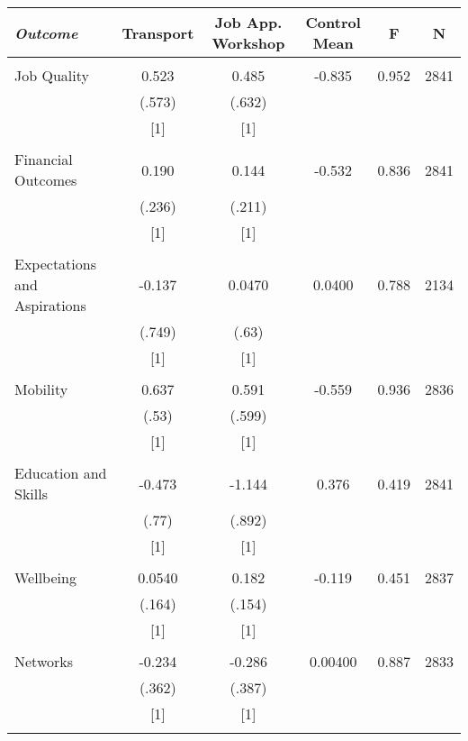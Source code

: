 \begin{tabular}{lccccc} \hline
\multicolumn{1}{l}{\emph{Outcome}} & \multicolumn{1}{c}{Transport} &\multicolumn{1}{c}{Job App. Workshop} & \multicolumn{1}{c}{Control Mean} & \multicolumn{1}{c}{F} & \multicolumn{1}{c}{N} \\ \hline \\
Job Quality & 0.523 & 0.485 & -0.835 & 0.952 & 2841 \\
& (.573) & (.632) &  &  &  \\
& [1] & [1] &  &  &  \\
&  &  &  &  &  \\
Financial Outcomes & 0.190 & 0.144 & -0.532 & 0.836 & 2841 \\
& (.236) & (.211) &  &  &  \\
& [1] & [1] &  &  &  \\
&  &  &  &  &  \\
Expectations and Aspirations & -0.137 & 0.0470 & 0.0400 & 0.788 & 2134 \\
& (.749) & (.63) &  &  &  \\
& [1] & [1] &  &  &  \\
&  &  &  &  &  \\
Mobility & 0.637 & 0.591 & -0.559 & 0.936 & 2836 \\
& (.53) & (.599) &  &  &  \\
& [1] & [1] &  &  &  \\
&  &  &  &  &  \\
Education and Skills & -0.473 & -1.144 & 0.376 & 0.419 & 2841 \\
& (.77) & (.892) &  &  &  \\
& [1] & [1] &  &  &  \\
&  &  &  &  &  \\
Wellbeing & 0.0540 & 0.182 & -0.119 & 0.451 & 2837 \\
& (.164) & (.154) &  &  &  \\
& [1] & [1] &  &  &  \\
&  &  &  &  &  \\
Networks & -0.234 & -0.286 & 0.00400 & 0.887 & 2833 \\
& (.362) & (.387) &  &  &  \\
& [1] & [1] &  &  &  \\
&  &  &  &  &  \\ \hline
\end{tabular}
